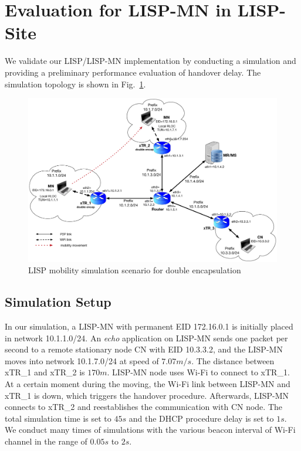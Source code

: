 \section{Evaluation for LISP-MN in LISP-Site}
\label{sec:ns3_evaluation_lispmn_xTR}
We validate our LISP/LISP-MN implementation by conducting a simulation and providing a preliminary performance evaluation of handover delay. The simulation topology is shown in Fig.~\ref{sim_scenario}.
\begin{figure}[!th]
	\centering
	\includegraphics[width=\textwidth]{Pics/mobility_through_subnets_2_encap_topo}
	\caption{LISP mobility simulation scenario for double encapsulation}
	\label{sim_scenario}
\end{figure}

\subsection{Simulation Setup}
\label{subsec:ns3_setup_lispmn_xTR}
In our simulation, a LISP-MN with permanent EID 172.16.0.1 is initially placed in network 10.1.1.0/24. An \emph{echo} application on LISP-MN sends one packet per second to a remote stationary node CN with EID 10.3.3.2, and the LISP-MN moves into network 10.1.7.0/24 at speed of $7.07m/s$. The distance between xTR\_1 and xTR\_2 is $170m$. LISP-MN node uses Wi-Fi to connect to xTR\_1. At a certain moment during the moving, the Wi-Fi link between LISP-MN and xTR\_1 is down, which triggers the handover procedure. Afterwards, LISP-MN connects to xTR\_2 and reestablishes the communication with CN node. The total simulation time is set to $45s$ and the DHCP procedure delay is set to $1s$. We conduct many times of simulations with the various beacon interval of Wi-Fi channel in the range of $0.05s$ to $2s$.

